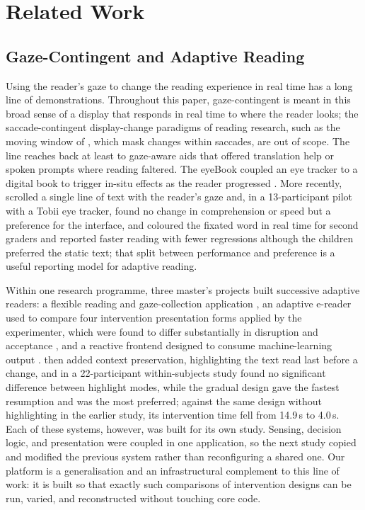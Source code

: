 \section{Related Work}
\label{sec:related}

\subsection{Gaze-Contingent and Adaptive Reading}

Using the reader's gaze to change the reading experience in real time has a long line of demonstrations.
Throughout this paper, gaze-contingent is meant in this broad sense of a display that responds in real time to where the reader looks; the saccade-contingent display-change paradigms of reading research, such as the moving window of \citet{mcconkie1975span}, which mask changes within saccades, are out of scope.
The line reaches back at least to gaze-aware aids that offered translation help \cite{hyrskykari2000idict} or spoken prompts \cite{sibert2000reading} where reading faltered.
The eyeBook coupled an eye tracker to a digital book to trigger in-situ effects as the reader progressed \cite{biedert2010eyebook}.
More recently, \citet{medan2024newline} scrolled a single line of text with the reader's gaze and, in a 13-participant pilot with a Tobii eye tracker, found no change in comprehension or speed but a preference for the interface, and \citet{rummens2026highlighting} coloured the fixated word in real time for second graders and reported faster reading with fewer regressions although the children preferred the static text; that split between performance and preference is a useful reporting model for adaptive reading.

Within one research programme, three master's projects built successive adaptive readers: a flexible reading and gaze-collection application \cite{refsgaard2024rtr}, an adaptive e-reader used to compare four intervention presentation forms applied by the experimenter, which were found to differ substantially in disruption and acceptance \cite{pereira2024typography}, and a reactive frontend designed to consume machine-learning output \cite{palinec2024reactive}.
\citet{jensen2025context} then added context preservation, highlighting the text read last before a change, and in a 22-participant within-subjects study found no significant difference between highlight modes, while the gradual design gave the fastest resumption and was the most preferred; against the same design without highlighting in the earlier study, its intervention time fell from 14.9\,s to 4.0\,s.
Each of these systems, however, was built for its own study.
Sensing, decision logic, and presentation were coupled in one application, so the next study copied and modified the previous system rather than reconfiguring a shared one.
Our platform is a generalisation and an infrastructural complement to this line of work: it is built so that exactly such comparisons of intervention designs can be run, varied, and reconstructed without touching core code.

